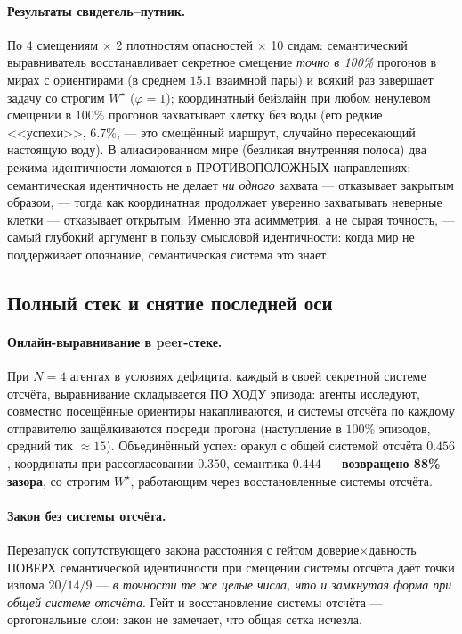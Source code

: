 \documentclass{article}
\newcommand{\wstar}{W^{\star}}
\begin{document}
\paragraph{Результаты свидетель--путник.} По 4 смещениям $\times$ 2
плотностям опасностей $\times$ 10 сидам: семантический выравниватель
восстанавливает секретное смещение \emph{точно в 100\%} прогонов в
мирах с ориентирами (в среднем $15.1$ взаимной пары) и всякий раз
завершает задачу со строгим $\wstar$ ($\varphi{=}1$); координатный
бейзлайн при любом ненулевом смещении в $100\%$ прогонов захватывает
клетку без воды (его редкие <<успехи>>, $6.7\%$, --- это смещённый
маршрут, случайно пересекающий настоящую воду). В алиасированном мире
(безликая внутренняя полоса) два режима идентичности ломаются в
ПРОТИВОПОЛОЖНЫХ направлениях: семантическая идентичность не делает
\emph{ни одного} захвата --- отказывает закрытым образом, --- тогда
как координатная продолжает уверенно захватывать неверные клетки ---
отказывает открытым. Именно эта асимметрия, а не сырая точность, ---
самый глубокий аргумент в пользу смысловой идентичности: когда мир не
поддерживает опознание, семантическая система это знает.

\subsection{Полный стек и снятие последней оси}
\label{sec:stack}

\paragraph{Онлайн-выравнивание в peer-стеке.} При $N{=}4$ агентах в
условиях дефицита, каждый в своей секретной системе отсчёта,
выравнивание складывается ПО ХОДУ эпизода: агенты исследуют, совместно
посещённые ориентиры накапливаются, и системы отсчёта по каждому
отправителю защёлкиваются посреди прогона (наступление в $100\%$
эпизодов, средний тик ${\approx}15$). Объединённый успех: оракул с
общей системой отсчёта $0.456$, координаты при рассогласовании
$0.350$, семантика $0.444$ --- \textbf{возвращено 88\% зазора}, со
строгим $\wstar$, работающим через восстановленные системы отсчёта.

\paragraph{Закон без системы отсчёта.} Перезапуск сопутствующего
закона расстояния с гейтом доверие$\times$давность ПОВЕРХ
семантической идентичности при смещении системы отсчёта даёт точки
излома $20/14/9$ --- \emph{в точности те же целые числа, что и
замкнутая форма при общей системе отсчёта}. Гейт и восстановление
системы отсчёта --- ортогональные слои: закон не замечает, что общая
сетка исчезла.
\end{document}
